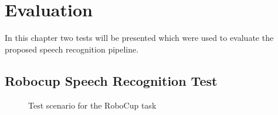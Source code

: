 

\chapter{Evaluation}

In this chapter two tests will be presented which were used to evaluate the proposed speech recognition pipeline.

\section{Robocup Speech Recognition Test}


\begin{figure}[ht]	
	\centering
	
	\caption{Test scenario for the RoboCup task}
	\label{pic:eval_task}
\end{figure}

